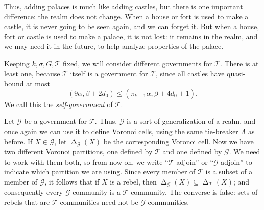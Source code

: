\documentclass[titlepage,11pt]{article}
\newcommand{\voro}{\operatorname{\Delta}}
\newcommand{\mac}{\mathcal}
\begin{document}
	Thus, adding palaces is much like adding castles, but there is one important difference: the realm does not change. 
	When a house or fort is used to make 
	a castle, it is never going to be seen again, and we can forget it. But when a house, fort or castle is used to make a palace,
	it is not lost: it remains in the realm, and we may need it in the future, to help analyze properties of the palace.
	
	Keeping $k, \sigma, G, \mac T$ fixed, we will consider different governments for $\mac T$. There is at least one, because 
	$\mac T$ itself is a government for $\mac T$,
	since all castles have quasi-bound at most 
	$$(9\alpha,\beta+2d_0)\le (\pi_{k+1}\alpha,\beta+4d_0+1).$$
	We call this
	the {\em self-government} of $\mac T$.
	
	Let $\mac G$ be a government for $\mac T$.
	Thus, $\mac G$ is a sort of generalization of a realm, and once again we can use it to define Voronoi cells, using the same tie-breaker $\Lambda$ as before. 
	If $X\in \mac G$, let $\voro_{\mac G} (X)$ be the 
	corresponding Voronoi cell. 
	Now we have two different Voronoi partitions, one defined by $\mac T$ and one defined by $\mac G$. We need to work with them both, so from now on, 
	we write ``$\mac T$-adjoin'' or ``$\mac G$-adjoin'' to indicate which partition we are using.
	Since every member of $\mac T$ is a subset of a member of $\mac G$, it follows that if $X$ is a rebel, then
	$\voro_{\mac G}(X)\subseteq \voro_{\mac T}(X)$; and consequently every $\mac G$-community is a $\mac T$-community. The converse is false: sets of rebels that are $\mac T$-communities need not be $\mac G$-communities.
	
\end{document}
